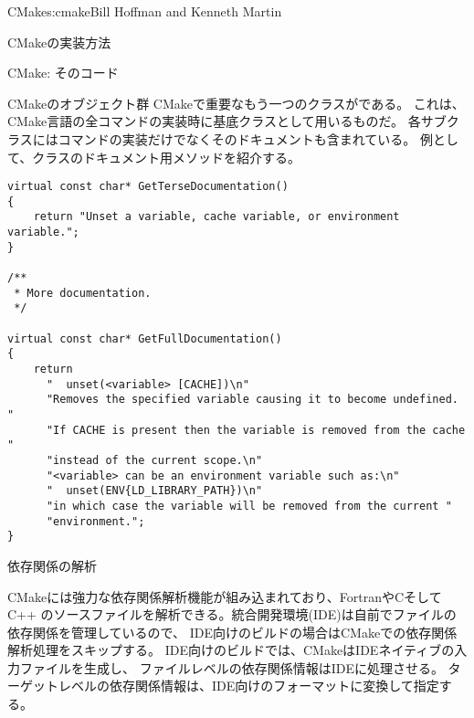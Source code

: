 \begin{aosachapter}{CMake}{s:cmake}{Bill Hoffman and Kenneth Martin}
\begin{aosasect1}{CMakeの実装方法}
\begin{aosasect2}{CMake: そのコード}
\begin{aosasect3}{CMakeのオブジェクト群}
CMakeで重要なもう一つのクラスがである。
これは、CMake言語の全コマンドの実装時に基底クラスとして用いるものだ。
各サブクラスにはコマンドの実装だけでなくそのドキュメントも含まれている。
例として、クラスのドキュメント用メソッドを紹介する。

\pagebreak

\begin{verbatim}
virtual const char* GetTerseDocumentation()
{
    return "Unset a variable, cache variable, or environment variable.";
}

/**
 * More documentation.
 */

virtual const char* GetFullDocumentation()
{
    return
      "  unset(<variable> [CACHE])\n"
      "Removes the specified variable causing it to become undefined.  "
      "If CACHE is present then the variable is removed from the cache "
      "instead of the current scope.\n"
      "<variable> can be an environment variable such as:\n"
      "  unset(ENV{LD_LIBRARY_PATH})\n"
      "in which case the variable will be removed from the current "
      "environment.";
}
\end{verbatim}

\end{aosasect3}

\begin{aosasect3}{依存関係の解析}

CMakeには強力な依存関係解析機能が組み込まれており、FortranやCそしてC++
のソースファイルを解析できる。統合開発環境(IDE)は自前でファイルの依存関係を管理しているので、
IDE向けのビルドの場合はCMakeでの依存関係解析処理をスキップする。
IDE向けのビルドでは、CMakeはIDEネイティブの入力ファイルを生成し、
ファイルレベルの依存関係情報はIDEに処理させる。
ターゲットレベルの依存関係情報は、IDE向けのフォーマットに変換して指定する。


\end{aosasect3}
\end{aosasect2}
\end{aosasect1}
\end{aosachapter}
